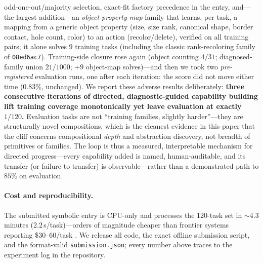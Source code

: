 odd-one-out/majority selection, exact-fit factory precedence in the entry, and---the largest addition---an
\emph{object-property-map} family that learns, per task, a mapping from a generic object property (size, size
rank, canonical shape, border contact, hole count, color) to an action (recolor/delete), verified on all
training pairs; it alone solves $9$ training tasks (including the classic rank-recoloring family of
\texttt{08ed6ac7}). Training-side closure rose again (object counting $4/31$; diagnosed-family union
$21/1000$; $+9$ object-map solves)---and then we took two \emph{pre-registered} evaluation runs, one after
each iteration: the score did not move either time ($0.83\%$, unchanged). We report these adverse results
deliberately: \textbf{three consecutive iterations of directed, diagnostic-guided capability building lift
training coverage monotonically yet leave evaluation at exactly $1/120$.} Evaluation tasks are not
``training families, slightly harder''---they are structurally novel compositions, which is the cleanest
evidence in this paper that the cliff concerns compositional \emph{depth} and abstraction discovery, not
breadth of primitives or families. The loop is thus a measured, interpretable mechanism for directed
progress---every capability added is named, human-auditable, and its transfer (or failure to transfer) is
observable---rather than a demonstrated path to $85\%$ on evaluation.

\paragraph{Cost and reproducibility.} The submitted symbolic entry is CPU-only and processes the 120-task set
in $\sim$4.3 minutes ($2.2$\,s/task)---orders of magnitude cheaper than frontier systems reporting
\$$30$--$60$/task \cite{arcprize2025techreport}. We release all code, the exact offline submission script, and the format-valid
\texttt{submission.json}; every number above traces to the experiment log in the repository.
